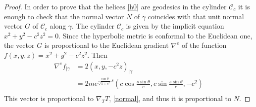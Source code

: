 \documentclass[10pt,a4paper]{amsart}
\begin{document}
\begin{proof}
In order to prove that the helices \eqref{h0} are geodesics  in the cylinder $\mathcal{C}_c$ it is enough to check that the normal vector $N$ of $\gamma$ coincides with that unit normal vector $G$ of $\mathcal{C}_c$ along $\gamma$. The cylinder $\mathcal{C}_c$ is given by the implicit equation $x^2+y^2-c^2z^2=0$. Since the hyperbolic metric is conformal to the Euclidean one, the vector $G$ is proportional to the Euclidean gradient $\nabla^e$ of the function $f(x,y,z)= x^2+y^2-c^2z^2$. Then 
\begin{equation*}
\begin{split}
\nabla^ef_{|\gamma}&=2(x,y,-c^2 z)_{|\gamma}\\
&=2me^{\frac{\cos\theta}{\sqrt{1+c^2}}s}\left(c \cos\frac{s\sin\theta}{c},c \sin \frac{s\sin\theta}{c}, -c^2\right)\\
\end{split}
\end{equation*}
This vector is proportional to $\nabla_TT$, \eqref{normal}, and thus it is proportional to $N$.
  \end{proof}
\end{document}
